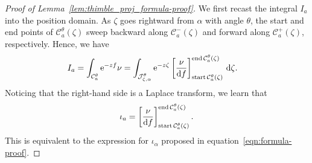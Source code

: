 \documentclass[10pt,a4paper]{amsart}
\numberwithin{equation}{section}
\begin{document}
\begin{proof}[Proof of Lemma~\ref{lem:thimble_proj_formula-proof}]
We first recast the integral $I_a$ into the position domain. As $\zeta$ goes rightward from $\alpha$ with angle $\theta$, the start and end points of $\mathcal{C}_a^\theta(\zeta)$ sweep backward along $\mathcal{C}^-_a(\zeta)$ and forward along $\mathcal{C}^+_a(\zeta)$, respectively. Hence, we have
\begin{align*}
I_a & = \int_{\mathcal{C}_a^\theta} {\rm e}^{-zf} \nu= \int_{\mathcal{J}_{\zeta,\alpha}^\theta}{\rm e}^{-z\zeta} \left[\frac{\nu}{{\rm d}f}\right]_{\operatorname{start} \mathcal{C}_a^\theta(\zeta)}^{\operatorname{end} \mathcal{C}_a^\theta(\zeta)} \,{\rm d}\zeta.
\end{align*}
Noticing that the right-hand side is a Laplace transform, we learn that
\begin{equation}\label{thimble-difference}
{\iota}_a = \left[\frac{\nu}{ {\rm d}f}\right]_{\operatorname{start} \mathcal{C}_a^\theta(\zeta)}^{\operatorname{end} \mathcal{C}_a^\theta(\zeta)}.
\end{equation}
This is equivalent to the expression for $\iota_\alpha$ proposed in equation~\eqref{eqn:formula-proof}.
\end{proof}
\end{document}
